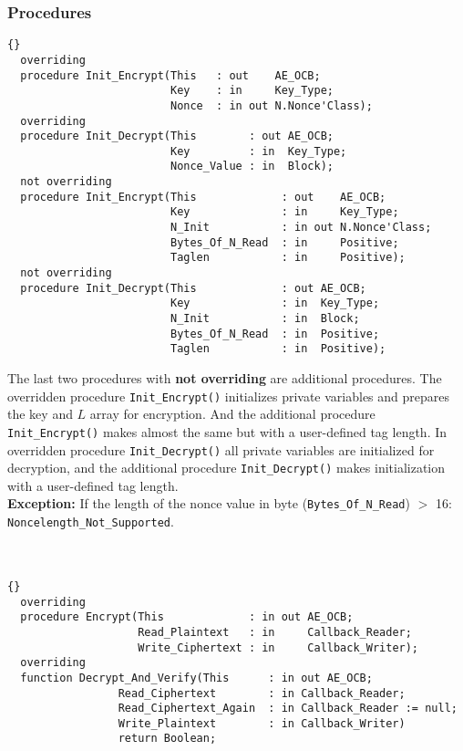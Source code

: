 \subsubsection*{Procedures}
\begin{lstlisting}{}
  overriding
  procedure Init_Encrypt(This   : out    AE_OCB;
                         Key    : in     Key_Type;
                         Nonce  : in out N.Nonce'Class);
  overriding
  procedure Init_Decrypt(This        : out AE_OCB;
                         Key         : in  Key_Type;
                         Nonce_Value : in  Block);
  not overriding
  procedure Init_Encrypt(This             : out    AE_OCB;
                         Key              : in     Key_Type;
                         N_Init           : in out N.Nonce'Class;
                         Bytes_Of_N_Read  : in     Positive;
                         Taglen           : in     Positive);
  not overriding
  procedure Init_Decrypt(This             : out AE_OCB;
                         Key              : in  Key_Type;
                         N_Init           : in  Block;
                         Bytes_Of_N_Read  : in  Positive;
                         Taglen           : in  Positive);
\end{lstlisting}
The last two procedures with \textbf{not overriding} are additional procedures. The overridden procedure \texttt{Init\_Encrypt()} initializes private variables and prepares the key and $L$ array for encryption. And the additional procedure \texttt{Init\_Encrypt()} makes almost the same but with a user-defined tag length. In overridden procedure \texttt{Init\_Decrypt()} all private variables are initialized for decryption, and the additional procedure \texttt{Init\_Decrypt()} makes initialization with a user-defined tag length.\\
\textbf{Exception:} If the length of the nonce value in byte (\texttt{Bytes\_Of\_N\_Read}) $>$ 16: \texttt{Noncelength\-\_Not\_Supported}.\\
\hline \\ \ \\
\begin{lstlisting}{}
  overriding
  procedure Encrypt(This             : in out AE_OCB;
                    Read_Plaintext   : in     Callback_Reader;
                    Write_Ciphertext : in     Callback_Writer);
  overriding
  function Decrypt_And_Verify(This      : in out AE_OCB;
                 Read_Ciphertext        : in Callback_Reader;
                 Read_Ciphertext_Again  : in Callback_Reader := null;
                 Write_Plaintext        : in Callback_Writer)
                 return Boolean;
\end{lstlisting}
